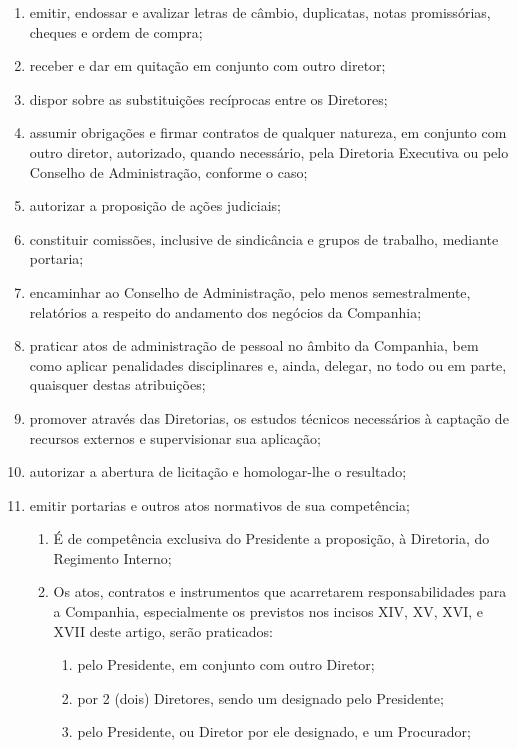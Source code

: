 \documentclass[a4paper,11pt]{report}
\begin{document}
\begin{enumerate}[resume, label=Art. \arabic*]
\begin{enumerate}[label=\roman*.]
        \item emitir, endossar e avalizar letras de câmbio, duplicatas, notas promissórias, cheques e ordem de compra;
        \item receber e dar em quitação em conjunto com outro diretor;
        \item dispor sobre as substituições recíprocas entre os Diretores;
        \item assumir obrigações e firmar contratos de qualquer natureza, em conjunto com outro diretor, autorizado, quando necessário, pela Diretoria Executiva ou pelo Conselho de Administração, conforme o caso;
        \item autorizar a proposição de ações judiciais;
        \item constituir comissões, inclusive de sindicância e grupos de trabalho, mediante portaria;
        \item encaminhar ao Conselho de Administração, pelo menos semestralmente, relatórios a respeito do andamento dos negócios da Companhia;
        \item praticar atos de administração de pessoal no âmbito da Companhia, bem como aplicar penalidades disciplinares e, ainda, delegar, no todo ou em parte, quaisquer destas atribuições;
        \item promover através das Diretorias, os estudos técnicos necessários à captação de recursos externos e supervisionar sua aplicação;
        \item autorizar a abertura de licitação e homologar-lhe o resultado;
        \item emitir portarias e outros atos normativos de sua competência;
                \begin{enumerate}[label= \S \arabic*]
                \item É de competência exclusiva do Presidente a proposição, à Diretoria, do Regimento Interno;
                \item Os atos, contratos e instrumentos que acarretarem responsabilidades para a Companhia, especialmente os previstos nos incisos XIV, XV, XVI, e XVII deste artigo, serão praticados:
                        \begin{enumerate}[label=\roman*.]
                        \item pelo Presidente, em conjunto com outro Diretor;
                        \item por 2 (dois) Diretores, sendo um designado pelo Presidente;
                        \item pelo Presidente, ou Diretor por ele designado, e um Procurador;

\end{enumerate}
\end{enumerate}
\end{enumerate}
\end{enumerate}
\end{document}
